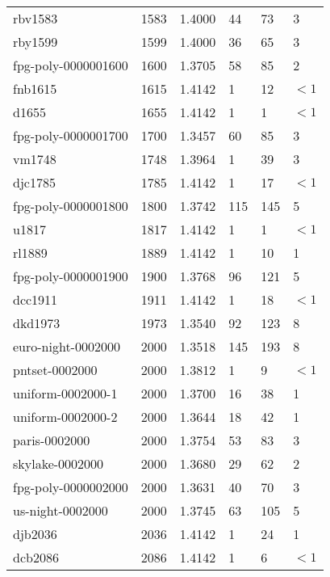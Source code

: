 \begin{longtable}{|lrrlll|}
rbv1583 & 1583 & \num{1.4000} & \num{44} & \num{73} & \num{3} \\
rby1599 & 1599 & \num{1.4000} & \num{36} & \num{65} & \num{3} \\
fpg-poly-0000001600 & 1600 & \num{1.3705} & \num{58} & \num{85} & \num{2} \\
fnb1615 & 1615 & \num{1.4142} & \num{1} & \num{12} & $<1$ \\
d1655 & 1655 & \num{1.4142} & \num{1} & \num{1} & $<1$ \\
fpg-poly-0000001700 & 1700 & \num{1.3457} & \num{60} & \num{85} & \num{3} \\
vm1748 & 1748 & \num{1.3964} & \num{1} & \num{39} & \num{3} \\
djc1785 & 1785 & \num{1.4142} & \num{1} & \num{17} & $<1$ \\
fpg-poly-0000001800 & 1800 & \num{1.3742} & \num{115} & \num{145} & \num{5} \\
u1817 & 1817 & \num{1.4142} & \num{1} & \num{1} & $<1$ \\
rl1889 & 1889 & \num{1.4142} & \num{1} & \num{10} & \num{1} \\
fpg-poly-0000001900 & 1900 & \num{1.3768} & \num{96} & \num{121} & \num{5} \\
dcc1911 & 1911 & \num{1.4142} & \num{1} & \num{18} & $<1$ \\
dkd1973 & 1973 & \num{1.3540} & \num{92} & \num{123} & \num{8} \\
euro-night-0002000 & 2000 & \num{1.3518} & \num{145} & \num{193} & \num{8} \\
pntset-0002000 & 2000 & \num{1.3812} & \num{1} & \num{9} & $<1$ \\
uniform-0002000-1 & 2000 & \num{1.3700} & \num{16} & \num{38} & \num{1} \\
uniform-0002000-2 & 2000 & \num{1.3644} & \num{18} & \num{42} & \num{1} \\
paris-0002000 & 2000 & \num{1.3754} & \num{53} & \num{83} & \num{3} \\
skylake-0002000 & 2000 & \num{1.3680} & \num{29} & \num{62} & \num{2} \\
fpg-poly-0000002000 & 2000 & \num{1.3631} & \num{40} & \num{70} & \num{3} \\
us-night-0002000 & 2000 & \num{1.3745} & \num{63} & \num{105} & \num{5} \\
djb2036 & 2036 & \num{1.4142} & \num{1} & \num{24} & \num{1} \\
dcb2086 & 2086 & \num{1.4142} & \num{1} & \num{6} & $<1$ \\

\end{longtable}
